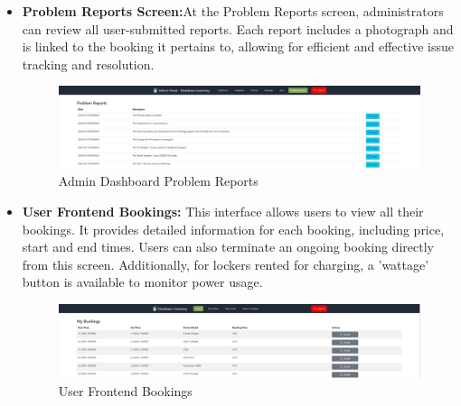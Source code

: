 \begin{itemize}
\item \textbf {Problem Reports Screen:}At the Problem Reports screen, administrators can review all user-submitted reports. Each report includes a photograph and is linked to the booking it pertains to, allowing for efficient and effective issue tracking and resolution.
\begin{figure}[h]
    \centering
    \includegraphics[width=1\linewidth]{images/problem reports.JPG}
    \caption{Admin Dashboard Problem Reports}
    \label{fig:problem-reports-dashboard}
\end{figure}
\newpage
\item \textbf{User Frontend Bookings:} This interface allows users to view all their bookings. It provides detailed information for each booking, including price, start and end times. Users can also terminate an ongoing booking directly from this screen. Additionally, for lockers rented for charging, a 'wattage' button is available to monitor power usage.
\begin{figure}[h]
    \centering
    \includegraphics[width=1\linewidth]{images/bookings.JPG}
    \caption{User Frontend Bookings}
    \label{fig:user-bookings-dashboard}
\end{figure}


\end{itemize}
